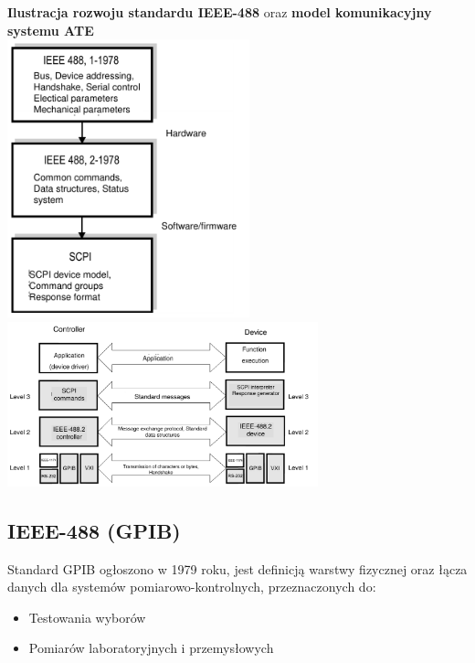 \textbf{Ilustracja rozwoju standardu IEEE-488} oraz \textbf{model komunikacyjny systemu ATE}\\
\includegraphics[width=7cm]{./wyklady/IEEE488_SCPI_17_1.pdf}
\includegraphics[width=9cm]{./wyklady/IEEE488_SCPI_18_1.pdf}

\newpage
\subsection{IEEE-488 (GPIB)}
Standard GPIB ogłoszono w 1979 roku, jest definicją warstwy fizycznej oraz łącza danych dla systemów pomiarowo-kontrolnych, przeznaczonych do:
\begin{itemize}
	\item Testowania wyborów
	\item Pomiarów laboratoryjnych i przemysłowych
\end{itemize}

